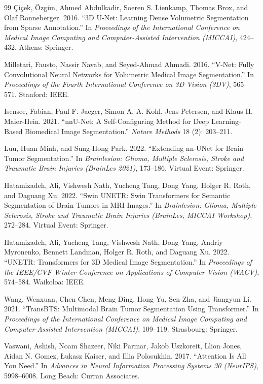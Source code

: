 \documentclass[conference]{IEEEtran}
\begin{document}
\begin{thebibliography}{99}
Çiçek, Özgün, Ahmed Abdulkadir, Soeren S. Lienkamp, Thomas Brox, and Olaf Ronneberger. 2016. ``3D U-Net: Learning Dense Volumetric Segmentation from Sparse Annotation.'' In \textit{Proceedings of the International Conference on Medical Image Computing and Computer-Assisted Intervention (MICCAI)}, 424--432. Athens: Springer.

Milletari, Fausto, Nassir Navab, and Seyed-Ahmad Ahmadi. 2016. ``V-Net: Fully Convolutional Neural Networks for Volumetric Medical Image Segmentation.'' In \textit{Proceedings of the Fourth International Conference on 3D Vision (3DV)}, 565--571. Stanford: IEEE.

Isensee, Fabian, Paul F. Jaeger, Simon A. A. Kohl, Jens Petersen, and Klaus H. Maier-Hein. 2021. ``nnU-Net: A Self-Configuring Method for Deep Learning-Based Biomedical Image Segmentation.'' \textit{Nature Methods} 18 (2): 203--211.

Luu, Huan Minh, and Sung-Hong Park. 2022. ``Extending nn-UNet for Brain Tumor Segmentation.'' In \textit{Brainlesion: Glioma, Multiple Sclerosis, Stroke and Traumatic Brain Injuries (BrainLes 2021)}, 173--186. Virtual Event: Springer.

Hatamizadeh, Ali, Vishwesh Nath, Yucheng Tang, Dong Yang, Holger R. Roth, and Daguang Xu. 2022. ``Swin UNETR: Swin Transformers for Semantic Segmentation of Brain Tumors in MRI Images.'' In \textit{Brainlesion: Glioma, Multiple Sclerosis, Stroke and Traumatic Brain Injuries (BrainLes, MICCAI Workshop)}, 272--284. Virtual Event: Springer.

Hatamizadeh, Ali, Yucheng Tang, Vishwesh Nath, Dong Yang, Andriy Myronenko, Bennett Landman, Holger R. Roth, and Daguang Xu. 2022. ``UNETR: Transformers for 3D Medical Image Segmentation.'' In \textit{Proceedings of the IEEE/CVF Winter Conference on Applications of Computer Vision (WACV)}, 574--584. Waikoloa: IEEE.

Wang, Wenxuan, Chen Chen, Meng Ding, Hong Yu, Sen Zha, and Jiangyun Li. 2021. ``TransBTS: Multimodal Brain Tumor Segmentation Using Transformer.'' In \textit{Proceedings of the International Conference on Medical Image Computing and Computer-Assisted Intervention (MICCAI)}, 109--119. Strasbourg: Springer.

Vaswani, Ashish, Noam Shazeer, Niki Parmar, Jakob Uszkoreit, Llion Jones, Aidan N. Gomez, {\L}ukasz Kaiser, and Illia Polosukhin. 2017. ``Attention Is All You Need.'' In \textit{Advances in Neural Information Processing Systems 30 (NeurIPS)}, 5998--6008. Long Beach: Curran Associates.


\end{thebibliography}
\end{document}
